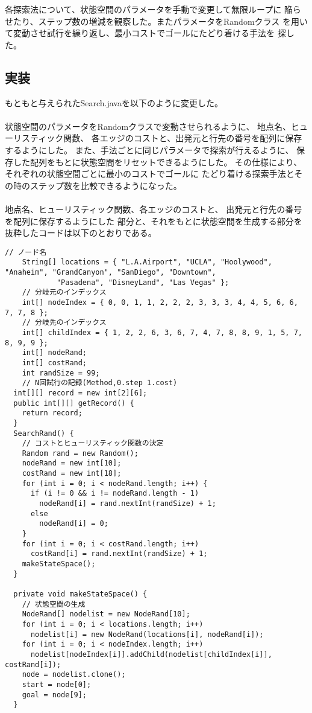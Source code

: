 \documentclass{jarticle}
\begin{document}
各探索法について、状態空間のパラメータを手動で変更して無限ループに
陥らせたり、ステップ数の増減を観察した。またパラメータをRandomクラス
を用いて変動させ試行を繰り返し、最小コストでゴールにたどり着ける手法を
探した。
\subsection{実装}

もともと与えられたSearch.javaを以下のように変更した。

\paragraph{}
状態空間のパラメータをRandomクラスで変動させられるように、
地点名、ヒューリスティック関数、
各エッジのコストと、出発元と行先の番号を配列に保存するようにした。
また、手法ごとに同じパラメータで探索が行えるように、
保存した配列をもとに状態空間をリセットできるようにした。
その仕様により、それぞれの状態空間ごとに最小のコストでゴールに
たどり着ける探索手法とその時のステップ数を比較できるようになった。\\

\paragraph{}
地点名、ヒューリスティック関数、各エッジのコストと、
出発元と行先の番号を配列に保存するようにした
部分と、それをもとに状態空間を生成する部分を
抜粋したコードは以下のとおりである。

\begin{lstlisting}[caption=SearchRandクラスより抜粋]
  // ノード名
	String[] locations = { "L.A.Airport", "UCLA", "Hoolywood", "Anaheim", "GrandCanyon", "SanDiego", "Downtown",
			"Pasadena", "DisneyLand", "Las Vegas" };
	// 分岐元のインデックス
	int[] nodeIndex = { 0, 0, 1, 1, 2, 2, 2, 3, 3, 3, 4, 4, 5, 6, 6, 7, 7, 8 };
	// 分岐先のインデックス
	int[] childIndex = { 1, 2, 2, 6, 3, 6, 7, 4, 7, 8, 8, 9, 1, 5, 7, 8, 9, 9 };
	int[] nodeRand;
	int[] costRand;
	int randSize = 99;
	// N回試行の記録(Method,0.step 1.cost)
  int[][] record = new int[2][6];
  public int[][] getRecord() {
    return record;
  }
  SearchRand() {
    // コストとヒューリスティック関数の決定
    Random rand = new Random();
    nodeRand = new int[10];
    costRand = new int[18];
    for (int i = 0; i < nodeRand.length; i++) {
      if (i != 0 && i != nodeRand.length - 1)
        nodeRand[i] = rand.nextInt(randSize) + 1;
      else
        nodeRand[i] = 0;
    }
    for (int i = 0; i < costRand.length; i++)
      costRand[i] = rand.nextInt(randSize) + 1;
    makeStateSpace();
  }
  
  private void makeStateSpace() {
    // 状態空間の生成
    NodeRand[] nodelist = new NodeRand[10];
    for (int i = 0; i < locations.length; i++)
      nodelist[i] = new NodeRand(locations[i], nodeRand[i]);
    for (int i = 0; i < nodeIndex.length; i++)
      nodelist[nodeIndex[i]].addChild(nodelist[childIndex[i]], costRand[i]);
    node = nodelist.clone();
    start = node[0];
    goal = node[9];
  }
\end{lstlisting}
\end{document}
